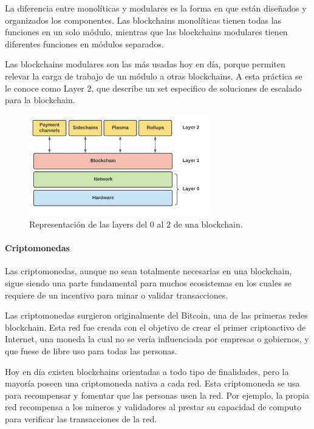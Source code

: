 La diferencia entre monolíticas y modulares es la forma en que están diseñados y organizados los componentes. Las blockchains monolíticas tienen todas las funciones en un solo módulo, mientras que las blockchains modulares tienen diferentes funciones en módulos separados.

\bigskip

Las blockchains modulares son las más usadas hoy en día, porque permiten relevar la carga de trabajo de un módulo a otras blockchains. A esta práctica se le conoce como Layer 2\cite{BinanceAcademy2023Feb}, que describe un set especifico de soluciones de escalado para la blockchain.

\begin{figure}[H]
        \centering
        \includegraphics[width=0.7\textwidth]{img/capturas/layer2.jpg}
        \caption{Representación de las layers del 0 al 2 de una blockchain.}
        \label{fig:configApi}
\end{figure}

\paragraph{Criptomonedas}

Las criptomonedas, aunque no sean totalmente necesarias en una blockchain, sigue siendo una parte fundamental para muchos ecosistemas en los cuales se requiere de un incentivo para minar o validar transacciones.

\bigskip

Las criptomonedas surgieron originalmente del Bitcoin, una de las primeras redes blockchain. Esta red fue creada con el objetivo de crear el primer criptoactivo de Internet, una moneda la cual no se vería influenciada por empresas o gobiernos, y que fuese de libre uso para todas las personas.

\bigskip

Hoy en día existen blockchains orientadas a todo tipo de finalidades, pero la mayoría poseen una criptomoneda nativa a cada red. Esta criptomoneda se usa para recompensar y fomentar que las personas usen la red. Por ejemplo, la propia red recompensa a los mineros y validadores al prestar su capacidad de computo para verificar las transacciones de la red.

